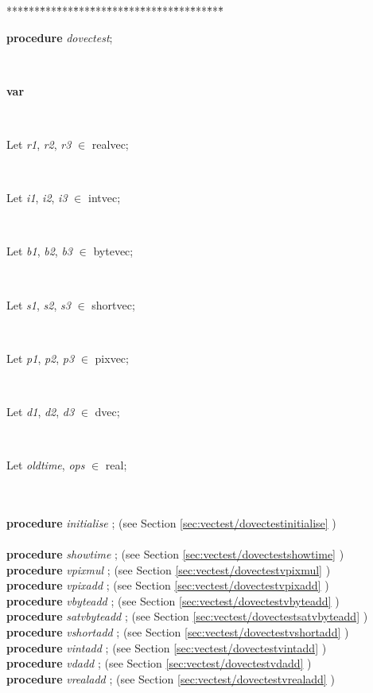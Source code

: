 \documentclass[10pt, a4paper]{article}
\begin{document}
\begin{tabbing}
***\=***\=***\=***\=***\=***\=***\=***\=***\=***\=***\=***\=***\=\kill
\parbox{14cm}{\textsf {\textbf {procedure } \textsf{\textit{dovectest}}; }}\\
\+\parbox{14cm}{\textsf{\textbf{var} }}\\
\parbox{14cm}{\textsf{Let \textit{r1}, \textit{r2}, \textit{r3} $\in$ realvec;}}\\
\parbox{14cm}{\textsf{Let \textit{i1}, \textit{i2}, \textit{i3} $\in$ intvec;}}\\
\parbox{14cm}{\textsf{Let \textit{b1}, \textit{b2}, \textit{b3} $\in$ bytevec;}}\\
\parbox{14cm}{\textsf{Let \textit{s1}, \textit{s2}, \textit{s3} $\in$ shortvec;}}\\
\parbox{14cm}{\textsf{Let \textit{p1}, \textit{p2}, \textit{p3} $\in$ pixvec;}}\\
\parbox{14cm}{\textsf{Let \textit{d1}, \textit{d2}, \textit{d3} $\in$ dvec;}}\\
\parbox{14cm}{\textsf{Let \textit{oldtime}, \textit{ops} $\in$ real;}}\\
\\
\<\textsf{\textbf{procedure}  \textit{initialise} ;} (see Section \ref{sec:vectest/dovectestinitialise} )\\
\\
\<\textsf{\textbf{procedure}  \textit{showtime} ;} (see Section \ref{sec:vectest/dovectestshowtime} )\\
\<\textsf{\textbf{procedure}  \textit{vpixmul} ;} (see Section \ref{sec:vectest/dovectestvpixmul} )\\
\<\textsf{\textbf{procedure}  \textit{vpixadd} ;} (see Section \ref{sec:vectest/dovectestvpixadd} )\\
\<\textsf{\textbf{procedure}  \textit{vbyteadd} ;} (see Section \ref{sec:vectest/dovectestvbyteadd} )\\
\<\textsf{\textbf{procedure}  \textit{satvbyteadd} ;} (see Section \ref{sec:vectest/dovectestsatvbyteadd} )\\
\<\textsf{\textbf{procedure}  \textit{vshortadd} ;} (see Section \ref{sec:vectest/dovectestvshortadd} )\\
\<\textsf{\textbf{procedure}  \textit{vintadd} ;} (see Section \ref{sec:vectest/dovectestvintadd} )\\
\<\textsf{\textbf{procedure}  \textit{vdadd} ;} (see Section \ref{sec:vectest/dovectestvdadd} )\\
\<\textsf{\textbf{procedure}  \textit{vrealadd} ;} (see Section \ref{sec:vectest/dovectestvrealadd} )\\

\end{tabbing}
\end{document}
